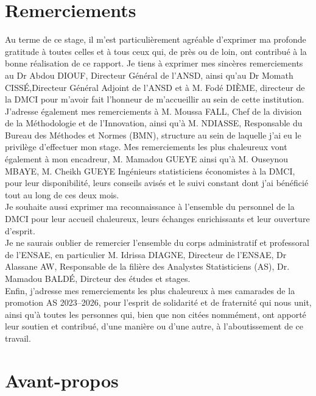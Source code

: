 \chapter*{Remerciements}


Au terme de ce stage, il m’est particulièrement agréable d’exprimer ma profonde gratitude à toutes celles et à tous ceux qui, de près ou de loin, ont contribué à la bonne réalisation de ce rapport.
Je tiens à exprimer mes sincères remerciements au Dr Abdou \textsc{DIOUF}, Directeur Général de l’ANSD, ainsi qu’au Dr Momath \textsc{CISSÉ},Directeur Général Adjoint de l’ANSD et à M. Fodé \textsc{DIÈME}, directeur de la DMCI pour m’avoir fait l’honneur de m’accueillir au sein de cette institution.\\
J’adresse également mes remerciements à M. Moussa \textsc{FALL}, Chef de la division de la Méthodologie et de l’Innovation, ainsi qu’à M. \textsc{NDIASSE}, Responsable du Bureau des Méthodes et Normes (BMN), structure au sein de laquelle j’ai eu le privilège d’effectuer mon stage.
Mes remerciements les plus chaleureux vont également à mon encadreur, M. Mamadou \textsc{GUEYE} ainsi qu'à M. Ouseynou \textsc{MBAYE}, M. Cheikh \textsc{GUEYE} Ingénieurs statisticiens économistes à la DMCI, pour leur disponibilité, leurs conseils avisés et le suivi constant dont j’ai bénéficié tout au long de ces deux mois.\\  
Je souhaite aussi exprimer ma reconnaissance à l’ensemble du personnel de la DMCI pour leur accueil chaleureux, leurs échanges enrichissants et leur ouverture d’esprit.\\
Je ne saurais oublier de remercier l’ensemble du corps administratif et professoral de l’ENSAE, en particulier M. Idrissa \textsc{DIAGNE}, Directeur de l’ENSAE, Dr Alassane \textsc{AW}, Responsable de la filière des Analystes Statisticiens (AS), Dr. Mamadou \textsc{BALDÉ}, Dircteur des études et stages.\\
Enfin, j’adresse mes remerciements les plus chaleureux à mes camarades de la promotion \textsc{AS 2023--2026}, pour l’esprit de solidarité et de fraternité qui nous unit, ainsi qu’à toutes les personnes qui, bien que non citées nommément, ont apporté leur soutien et contribué, d’une manière ou d’une autre, à l’aboutissement de ce travail.  



\chapter*{Avant-propos}

